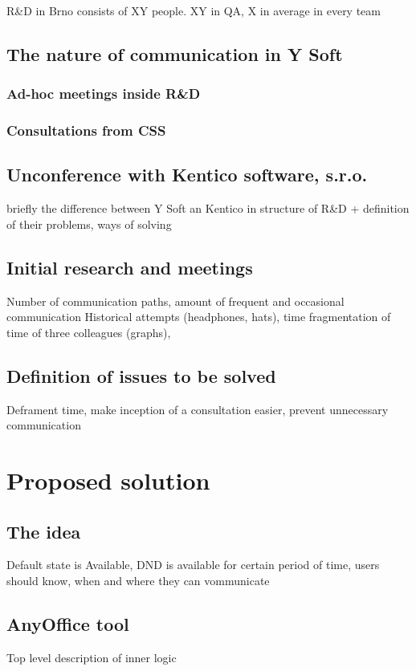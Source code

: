 \documentclass[11pt,singleside]{myfithesis2}
\begin{document}
R\&D in Brno consists of XY people. XY in QA, X in average in every team

	\section{The nature of communication in Y Soft}

		\subsection{Ad-hoc meetings inside R\&D}
		
		\subsection{Consultations from CSS}

	\section{Unconference with Kentico software, s.r.o.}
briefly the difference between Y Soft an Kentico in structure of R\&D + definition of their problems, ways of solving

	\section{Initial research and meetings}
Number of communication paths, amount of frequent and occasional communication
Historical attempts (headphones, hats), time fragmentation of time of three colleagues (graphs), 

	\section{Definition of issues to be solved}
Deframent time, make inception of a consultation easier, prevent unnecessary communication

\chapter{Proposed solution}

	\section{The idea}
Default state is Available, DND is available for certain period of time, users should know, when and where they can vommunicate
	
	\section{AnyOffice tool}
Top level description of inner logic
\end{document}
